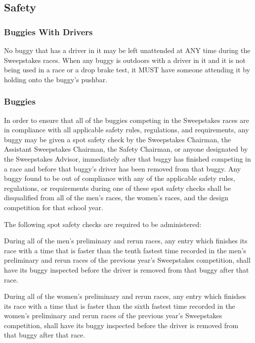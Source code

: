 \documentclass[openany]{book}
\begin{document}
\subsection{Safety}

\subsubsection{Buggies With Drivers}

No buggy that has a driver in it may be left unattended at ANY time during the Sweepstakes races. When any buggy is outdoors with a driver in it and it is not being used in a race or a drop brake test, it MUST have someone attending it by holding onto the buggy's pushbar.

\subsubsection{Buggies}

In order to ensure that all of the buggies competing in the Sweepstakes races are in compliance with all applicable safety rules, regulations, and requirements, any buggy may be given a spot safety check by the Sweepstakes Chairman, the Assistant Sweepstakes Chairman, the Safety Chairman, or anyone designated by the Sweepstakes Advisor, immediately after that buggy has finished competing in a race and before that buggy's driver has been removed from that buggy. Any buggy found to be out of compliance with any of the applicable safety rules, regulations, or requirements during one of these spot safety checks shall be disqualified from all of the men's races, the women's races, and the design competition for that school year.

The following spot safety checks are required to be administered:

During all of the men's preliminary and rerun races, any entry which finishes its race with a time that is faster than the tenth fastest time recorded in the men's preliminary and rerun races of the previous year's Sweepstakes competition, shall have its buggy inspected before the driver is removed from that buggy after that race.

During all of the women's preliminary and rerun races, any entry which finishes its race with a time that is faster than the sixth fastest time recorded in the women's preliminary and rerun races of the previous year's Sweepstakes competition, shall have its buggy inspected before the driver is removed from that buggy after that race.
\end{document}
